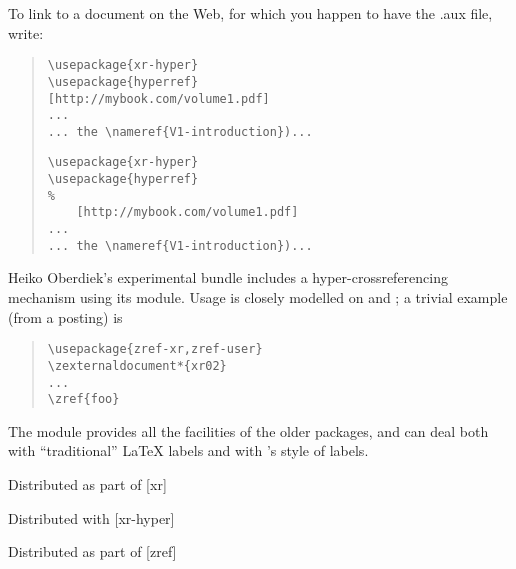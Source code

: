 To link to a  document on the Web, for which you happen to
have the .aux file, write:
\begin{quote}
\begin{wideversion}
\begin{verbatim}
\usepackage{xr-hyper}
\usepackage{hyperref}
[http://mybook.com/volume1.pdf]
...
... the \nameref{V1-introduction})...
\end{verbatim}
\end{wideversion}
\begin{narrowversion}
\begin{verbatim}
\usepackage{xr-hyper}
\usepackage{hyperref}
%
    [http://mybook.com/volume1.pdf]
...
... the \nameref{V1-introduction})...
\end{verbatim}
\end{narrowversion}
\end{quote}
Heiko Oberdiek's experimental  bundle includes a
hyper-crossreferencing mechanism using its  module.
Usage is closely modelled on  and ; a
trivial example (from a  posting) is
\begin{quote}
\begin{verbatim}
\usepackage{zref-xr,zref-user}
\zexternaldocument*{xr02}
...
\zref{foo}
\end{verbatim}
\end{quote}
The module provides all the facilities of the older packages, and can
deal both with ``traditional'' \LaTeX{} labels and with
's style of labels.
\begin{ctanrefs}
\item[xr.sty]Distributed as part of [xr]
\item[xr-hyper.sty]Distributed with [xr-hyper]
\item[zref \nothtml{\rmfamily\itshape}bundle]Distributed as part of
  [zref]
\end{ctanrefs}

